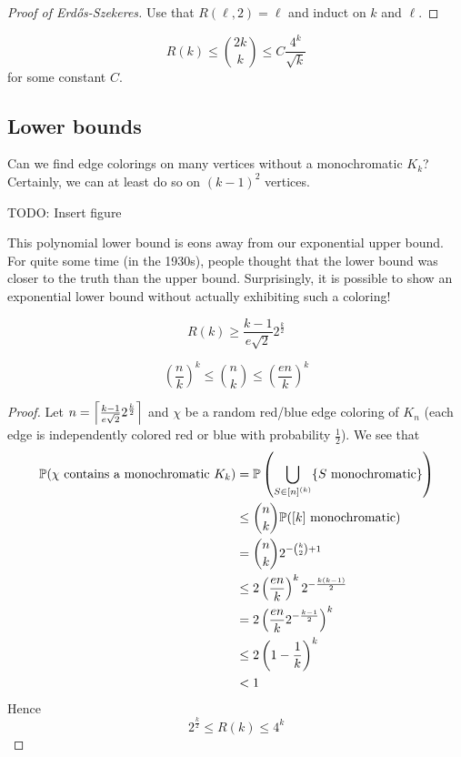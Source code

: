 \documentclass{article}
\begin{document}
\begin{proof}[Proof of Erd\H os-Szekeres]
  Use that $R(\ell, 2) = \ell$ and induct on $k$ and $\ell$.
\end{proof}

\begin{cor}
  $$R(k) \le \binom{2k} k \le C\frac{4^k}{\sqrt k}$$
  for some constant $C$.
\end{cor}

\subsection{Lower bounds}

Can we find edge colorings on many vertices without a monochromatic $K_k$?
Certainly, we can at least do so on $(k - 1)^2$ vertices.

TODO: Insert figure

This polynomial lower bound is eons away from our exponential upper bound. For quite some time (in the 1930s), people thought that the lower bound was closer to the truth than the upper bound. Surprisingly, it is possible to show an exponential lower bound without actually exhibiting such a coloring!

\begin{thm}[Erd\H os, 1948]
  $$R(k) \ge \frac{k - 1}{e\sqrt 2}2^{\frac k 2}$$
\end{thm}
\begin{fact}
  $$\left(\frac n k\right)^k \le \binom n k \le \left(\frac{en}k\right)^k$$
\end{fact}
\begin{proof}
  Let $n = \ceil{\frac{k - 1}{e\sqrt 2}2^{\frac k 2}}$ and $\chi$ be a random red/blue edge coloring of $K_n$ (each edge is independently colored red or blue with probability $\frac 1 2$). We see that
  \begin{align*}
    \P(\chi \text{ contains a monochromatic } K_k)
    & = \P\left(\bigcup_{S \in [n]^{(k)}} \{S \text{ monochromatic}\}\right) \\
    & \le \binom n k \P([k] \text{ monochromatic}) \\
    & = \binom n k 2^{-\binom k 2 + 1} \\
    & \le 2 \left(\frac{en}k\right)^k 2^{-\frac{k(k - 1)}2} \\
    & = 2 \left(\frac{en}k 2^{-\frac{k - 1}2}\right)^k \\
    & \le 2\left(1 - \frac 1 k\right)^k \\
    & < 1
  \end{align*}
  Hence
  $$2^{\frac k 2} \le R(k) \le 4^k$$
\end{proof}
\end{document}
